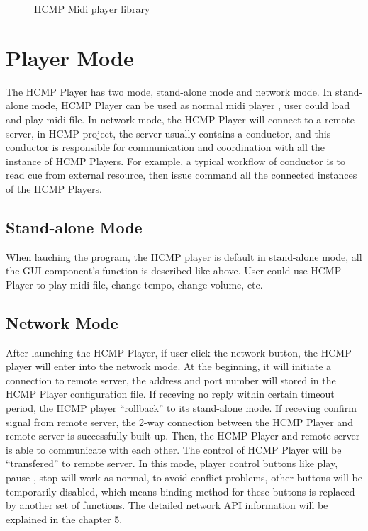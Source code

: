 \begin{figure}[H]
\caption{HCMP Midi player library}
\label{fig:speciation}
\end{figure}

\section{Player Mode}

The HCMP Player has two mode, stand-alone mode and network mode. 
In stand-alone mode, HCMP Player can be used as normal midi player 
, user could load and play midi file. In network mode, 
the HCMP Player will connect to a remote 
server, in HCMP project, the server usually contains a conductor, and this
conductor is responsible for communication and coordination with all the 
instance of HCMP Players. For example, 
a typical workflow of conductor is to read cue from external resource, 
then issue command all the connected instances of the HCMP Players.

\subsection{Stand-alone Mode}

When lauching the program, the HCMP player is default in stand-alone mode, 
all the GUI component's function is described like above. 
User could use HCMP Player to play midi file, change tempo, change volume, etc.


\subsection{Network Mode}

After launching the HCMP Player, if user click the network button, 
the HCMP player will enter into    
the network mode. At the beginning, it will initiate a connection 
to remote server, the address and port number will stored in the
HCMP Player configuration file. If receving no reply within certain 
timeout period, the HCMP player ``rollback'' to its stand-alone mode.
If receving confirm signal from
remote server, the 2-way connection between the HCMP Player and 
remote server is successfully built up. Then, the HCMP Player and 
remote server is able to communicate with each other. The control of HCMP 
Player will be ``transfered'' to remote server. 
In this mode, player control buttons like play, pause   
, stop will work as normal, to avoid conflict problems, other buttons will 
be temporarily disabled, which means binding method for these buttons is replaced by
another set of functions. The detailed network API information will be explained  
in the chapter 5.
